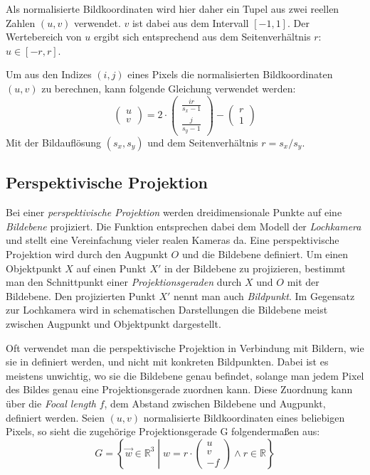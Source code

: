 \documentclass[ngerman,a4paper,parskip=half]{scrartcl}
\def \R{\mathbb{R}}
\begin{document}
Als normalisierte Bildkoordinaten wird hier daher ein Tupel aus zwei reellen Zahlen $(u,v)$ verwendet. $v$ ist dabei aus dem Intervall $[-1,1]$. Der Wertebereich von $u$ ergibt sich entsprechend aus dem Seitenverhältnis $r$: $u \in [-r,r]$.

Um aus den Indizes $(i,j)$ eines Pixels die normalisierten Bildkoordinaten $(u,v)$ zu berechnen, kann folgende Gleichung verwendet werden:
\[ \begin{pmatrix}
u \\ v
\end{pmatrix} = 2 \cdot \begin{pmatrix}
\frac{i r}{s_x - 1} \\
\frac{j}{s_y - 1}
\end{pmatrix} - \begin{pmatrix}
r \\ 1
\end{pmatrix} \]
Mit der Bildauflösung $(s_x, s_y)$ und dem Seitenverhältnis $r = s_x/s_y$.

\subsection{Perspektivische Projektion}

Bei einer \emph{perspektivische Projektion} werden dreidimensionale Punkte auf eine \emph{Bildebene} projiziert. Die Funktion entsprechen dabei dem Modell der \emph{Lochkamera} und stellt eine Vereinfachung vieler realen Kameras da. Eine perspektivische Projektion wird durch den Augpunkt $O$ und die Bildebene definiert. Um einen Objektpunkt $X$ auf einen Punkt $X'$ in der Bildebene zu projizieren, bestimmt man den Schnittpunkt einer \emph{Projektionsgeraden} durch $X$ und $O$ mit der Bildebene. Den projizierten Punkt $X'$ nennt man auch \emph{Bildpunkt}. Im Gegensatz zur Lochkamera wird in schematischen Darstellungen die Bildebene meist zwischen Augpunkt und Objektpunkt dargestellt.

Oft verwendet man die perspektivische Projektion in Verbindung mit Bildern, wie sie in  definiert werden, und nicht mit konkreten Bildpunkten. Dabei ist es meistens unwichtig, wo sie die Bildebene genau befindet, solange man jedem Pixel des Bildes genau eine Projektionsgerade zuordnen kann. Diese Zuordnung kann über die \emph{Focal length} $f$, dem Abstand zwischen Bildebene und Augpunkt, definiert werden. Seien $(u,v)$ normalisierte Bildkoordinaten eines beliebigen Pixels, so sieht die zugehörige Projektionsgerade G folgendermaßen aus:
\[ G = \left\lbrace \vec{w} \in \R^3 \middle\vert w = r \cdot \begin{pmatrix}
u \\ v \\ -f
\end{pmatrix} \land r \in \R \right\rbrace \]
\end{document}
